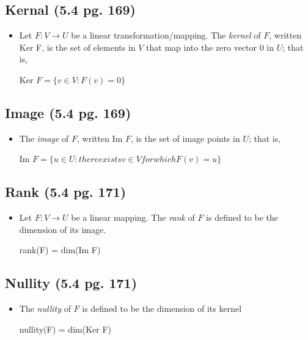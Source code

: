 \documentclass[hidelinks, 11pt, openleft]{scrartcl}
\begin{document}
\subsection*{Kernal (5.4 pg. 169)}

\begin{itemize}
    \item Let $F: V \to U$ be a linear transformation/mapping. The \textit{kernel} of $F$, written Ker F, is the set of elements in $V$ that map into the zero vector 0 in $U$; that is,
    \begin{center}
        Ker $F = \{v \in V: F(v) = 0\}$
    \end{center}
\end{itemize}

\subsection*{Image (5.4 pg. 169)}

\begin{itemize}
    \item The \textit{image} of $F$, written Im $F$, is the set of image points in $U$; that is,
    \begin{center}
        Im $F = \{u \in U: there exists v \in V for which F(v) = u\}$
    \end{center}
\end{itemize}

\subsection*{Rank (5.4 pg. 171)}
\begin{itemize}
    \item Let $F: V \to U$ be a linear mapping. The \textit{rank} of $F$ is defined to be the dimension of its image.
    \begin{center}
        rank(F) = dim(Im F)
    \end{center}
\end{itemize}

\subsection*{Nullity (5.4 pg. 171)}
\begin{itemize}
    \item The \textit{nullity} of $F$ is defined to be the dimension of its kernel
    \begin{center}
        nullity(F) = dim(Ker F)
    \end{center}
\end{itemize}
\end{document}
